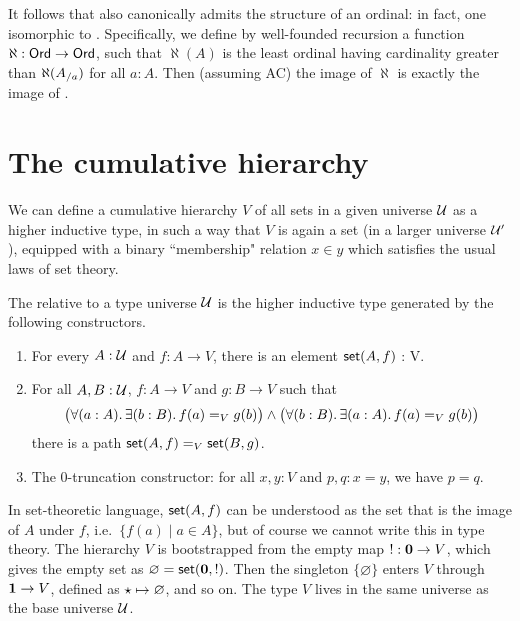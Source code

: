 It follows that \card also canonically admits the structure of an ordinal: in fact, one isomorphic to \ord.
Specifically, we define by well-founded recursion a function $\aleph:\ord\to\ord$, such that $\aleph(A)$ is the least ordinal having cardinality greater than $\aleph({\ordsl A a})$ for all $a:A$.
Then (assuming AC) the image of $\aleph$ is exactly the image of \card.


\section{The cumulative hierarchy}
\label{sec:cumulative-hierarchy}

We can define a cumulative hierarchy $V$ of all sets in a given universe $\UU$ as a higher inductive type, in such a way that $V$ is again a set (in a larger universe $\UU'$), equipped with a binary ``membership" relation $x\in y$ which satisfies the usual laws of set theory.

\begin{defn}
  The  relative to a type universe $\UU$ is the
  higher inductive type generated by the following constructors.
  \begin{enumerate}
  \item For every $A : \UU$ and $f : A \to V$, there is an element $\vset(A, f)$ : V.
  \item For all $A, B : \UU$, $f : A \to V$ and $g : B \to V$ such that
    \begin{equation} \label{eq:V-path}
      \big(\fall{a:A} \exis{b:B} \id[V]{f(a)}{g(b)}\big) \land \big(\fall{b:B} \exis{a:A} \id[V]{f(a)}{g(b)}\big)
    \end{equation}
    there is a path $\id[V]{\vset(A,f)}{\vset(B,g)}$.
  \item The 0-truncation constructor: for all $x,y:V$ and $p,q:x=y$, we have $p=q$.
  \end{enumerate}
\end{defn}

In set-theoretic language, $\vset(A,f)$ can be understood as the set that is the image of $A$ under $f$, i.e.\ $\{ f(a) \mid a
\in A \}$, but of course we cannot write this in type theory. The hierarchy $V$ is
bootstrapped from the empty map $! : \emptyt \to V$, which gives the empty set as $\varnothing = \vset(\emptyt,!)$.
Then the singleton $\{\varnothing\}$ enters $V$ through $\unit \to V$, defined as $\ttt \mapsto \varnothing$, and so
on. The type $V$ lives in the same universe as the base universe $\UU$.

